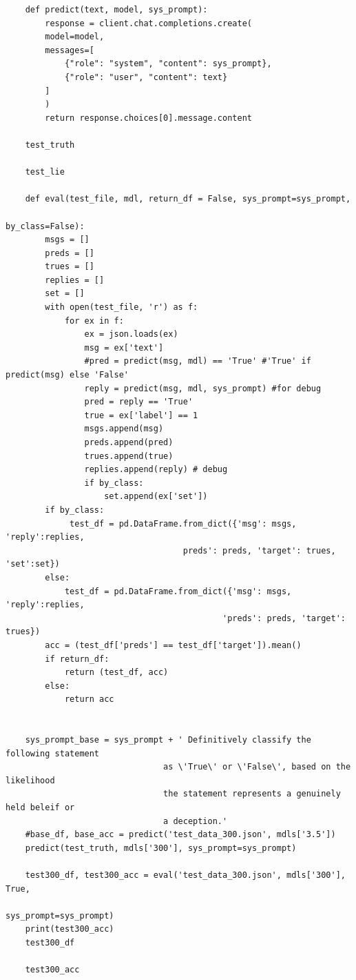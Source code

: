 \documentclass[10pt,twocolumn,letterpaper]{article}
\begin{document}
\begin{verbatim}
    def predict(text, model, sys_prompt):
        response = client.chat.completions.create(
        model=model,
        messages=[
            {"role": "system", "content": sys_prompt},
            {"role": "user", "content": text}
        ]
        )
        return response.choices[0].message.content
    
    test_truth
    
    test_lie
    
    def eval(test_file, mdl, return_df = False, sys_prompt=sys_prompt, 
                                                                by_class=False):
        msgs = []
        preds = []
        trues = []
        replies = []
        set = []
        with open(test_file, 'r') as f:
            for ex in f:
                ex = json.loads(ex)
                msg = ex['text']
                #pred = predict(msg, mdl) == 'True' #'True' if predict(msg) else 'False'
                reply = predict(msg, mdl, sys_prompt) #for debug
                pred = reply == 'True'
                true = ex['label'] == 1
                msgs.append(msg)
                preds.append(pred)
                trues.append(true)
                replies.append(reply) # debug
                if by_class:
                    set.append(ex['set'])
        if by_class:
             test_df = pd.DataFrame.from_dict({'msg': msgs, 'reply':replies, 
                                    preds': preds, 'target': trues, 'set':set})
        else:
            test_df = pd.DataFrame.from_dict({'msg': msgs, 'reply':replies, 
                                            'preds': preds, 'target': trues})
        acc = (test_df['preds'] == test_df['target']).mean()
        if return_df:
            return (test_df, acc)
        else:
            return acc
    
    
    sys_prompt_base = sys_prompt + ' Definitively classify the following statement 
                                as \'True\' or \'False\', based on the likelihood  
                                the statement represents a genuinely held beleif or 
                                a deception.'
    #base_df, base_acc = predict('test_data_300.json', mdls['3.5'])
    predict(test_truth, mdls['300'], sys_prompt=sys_prompt)
    
    test300_df, test300_acc = eval('test_data_300.json', mdls['300'], True, 
                                                            sys_prompt=sys_prompt)
    print(test300_acc)
    test300_df
    
    test300_acc
    

\end{verbatim}
\end{document}
